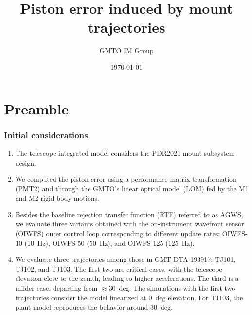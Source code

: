 \documentclass[10pt]{beamer}
\title{Piston error induced by mount trajectories}
\author{GMTO IM Group}
\date{\today}
\begin{document}
\frame{\titlepage}



\section{Preamble}
\frame
{
  \frametitle{Initial considerations}
  \begin{enumerate}
  \item The telescope integrated model considers the PDR2021 mount subsystem design.
  \item We computed the piston error using a performance matrix transformation (PMT2) and through the GMTO's linear optical model (LOM) fed by the M1 and M2 rigid-body motions.
  \item Besides the baseline rejection transfer function (RTF) referred to as AGWS, we evaluate three variants obtained with the on-instrument wavefront sensor (OIWFS) outer control loop corresponding to different update rates: OIWFS-10 (\SI{10}{Hz}), OIWFS-50 (\SI{50}{Hz}), and OIWFS-125 (\SI{125}{Hz}).
  \item We evaluate three trajectories among those in GMT-DTA-193917: TJ101, TJ102, and TJ103. The first two are critical cases, with the telescope elevation close to the zenith, leading to higher accelerations. The third is a milder case, departing from $\approx$\SI{30}{deg}. The simulations with the first two trajectories consider the model linearized at \SI{0}{deg} elevation. For TJ103, the plant model reproduces the behavior around \SI{30}{deg}.
  \end{enumerate}
  
}

\end{document}
